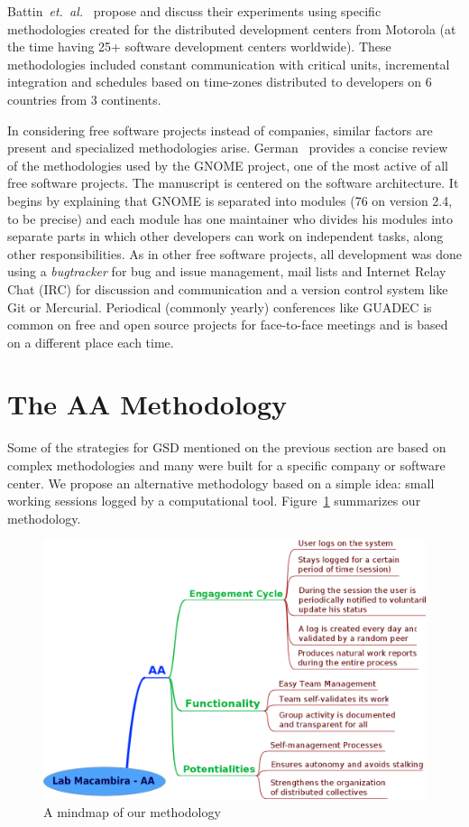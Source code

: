 \documentclass{article}
\newcommand{\etal}{{\it et.~al.}}
\begin{document}
Battin~\etal~\cite{battin2001} propose and discuss their
experiments using specific methodologies created for the distributed
development centers from Motorola (at the time having 25+
software development centers worldwide). These methodologies included
constant communication with critical units, incremental integration
and schedules based on time-zones distributed to developers on 6
countries from 3 continents.

In considering free software projects instead of companies,
similar factors are present and specialized methodologies
arise. German~\cite{german2003} provides a concise review of
the methodologies used by the GNOME project, one of the most active of all free
software projects. The manuscript is centered on the software architecture. It
begins by explaining that GNOME is separated into modules (76 on version 2.4, to be
precise) and each module has one maintainer who divides his modules into
separate parts in which other developers can work on independent tasks, along
other responsibilities. As in other free software projects, all 
development was done using a \emph{bugtracker} for bug and issue management,
mail lists and Internet Relay Chat (IRC) for discussion and communication and a
version control system like Git or Mercurial. Periodical (commonly yearly)
conferences like GUADEC is common on free and open source projects for
face-to-face meetings and is based on a different place each time.


\section{The AA Methodology}
\label{aa-methodology}

Some of the strategies for GSD mentioned on the previous section are based on complex methodologies
and many were built for a specific company or software
center. We propose an alternative methodology based on a simple
idea: small working sessions logged by a computational
tool. Figure~\ref{fig:mm} summarizes our methodology.

\begin{figure}
\begin{center}
   \includegraphics[width=0.8\linewidth,keepaspectratio=true]{figs/aa-mm.png}
\end{center}
   \caption{
   A mindmap of our methodology
   }
\label{fig:mm}
\end{figure}
\end{document}
